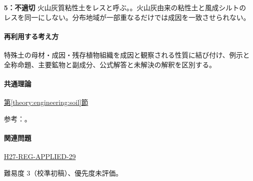 \noindent\textbf{5：不適切} 火山灰質粘性土をレスと呼ぶ。。火山灰由来の粘性土と風成シルトのレスを同一にしない。分布地域が一部重なるだけでは成因を一致させられない。\par

\paragraph{再利用する考え方} 特殊土の母材・成因・残存植物組織を成因と観察される性質に結び付け、例示と全称命題、主要鉱物と副成分、公式解答と未解決の解釈を区別する。

\paragraph{共通理論} \hyperref[theory:engineering:soil]{第\ref*{theory:engineering:soil}節}

\par 参考：\cite{mlit_masa,maff_shiras2017,mlit_peat,gsj_loess2002}。

\paragraph{関連問題} \hyperref[q:h27-reg-applied-29]{H27-REG-APPLIED-29}

\par 難易度 3（校準初稿）、優先度未評価。
